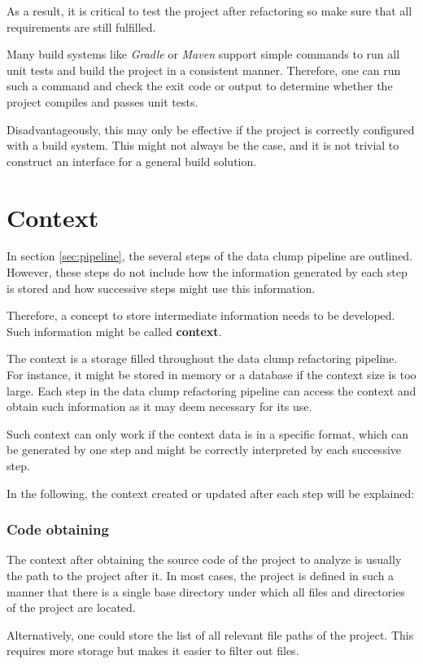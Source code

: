 As a result, it is critical to test the project after refactoring so make sure that all requirements are still fulfilled.

Many build systems like \textit{Gradle} or \textit{Maven} support simple commands to run all unit tests and build the project in a consistent manner.  Therefore, one can run such a command and check the exit code or output to determine whether the project compiles and passes unit tests.

Disadvantageously, this may only be effective if the project is correctly configured with a build system. This might not always be the case, and it is not trivial to construct an interface for a general build solution. 


\section{Context}
In section \ref{sec:pipeline}, the several steps of the data clump pipeline are outlined. However, these steps do not include how the information generated by each step is stored and how successive steps might use this information.

Therefore, a concept to store intermediate information needs to be developed. Such information might be called \textbf{context}.

The context is a storage filled throughout the data clump refactoring pipeline. For instance, it might be stored in memory or a database if the context size is too large. Each step in the data clump refactoring pipeline can access the context and obtain such information as it may deem necessary for its use.

Such context can only work if the context data is in a specific format, which can be generated by one step and might be correctly interpreted by each successive step. 

In the following, the context created or updated after each step will be explained:

\subsubsection{Code obtaining}
The context after obtaining the source code of the project to analyze is usually the path to the project after it. In most cases, the project is defined in such a manner that there is a single base directory under which all files and directories of the project are located.

Alternatively, one could store the list of all relevant file paths of the project. This requires more storage but makes it easier to filter out files.


